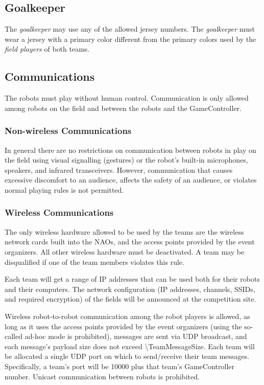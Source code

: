\subsection{Goalkeeper}
\label{sec:goalkeeper}

The \emph{goalkeeper} may use any of the allowed jersey numbers.
The \emph{goalkeeper} must wear a jersey with a primary color different from the primary colors used by the \emph{field players} of both teams.

\subsection{Communications}

The robots must play without human control.
Communication is only allowed among robots on the field and between the robots and the GameController.

\subsubsection{Non-wireless Communications}
\label{sec:acoustic}

In general there are no restrictions on communication between robots in play on the field using visual signalling (\eg gestures) or the robot's built-in microphones, speakers, and infrared transceivers.
However, communication that causes excessive discomfort to an audience, affects the safety of an audience, or violates normal playing rules is not permitted.

\subsubsection{Wireless Communications}
\label{sec:wireless}

The only wireless hardware allowed to be used by the teams are the wireless network cards built into the NAOs, and the access points provided by the event organizers.
All other wireless hardware must be deactivated.
A team may be disqualified if one of the team members violates this rule.

Each team will get a range of IP addresses that can be used both for their robots and their computers.
The network configuration (\eg IP addresses, channels, SSIDs, and required encryption) of the fields will be announced at the competition site.

Wireless robot-to-robot communication among the robot players is allowed, as long as it uses the access points provided by the event organizers (using the so-called ad-hoc mode is prohibited), messages are sent via UDP broadcast, and each message's payload size does not exceed \qty{\TeamMessageSize}{\byte}.
Each team will be allocated a single UDP port on which to send/receive their team messages.
Specifically, a team's port will be 10000 plus that team's GameController number.
Unicast communication between robots is prohibited.

